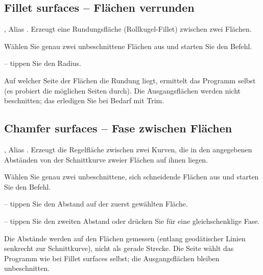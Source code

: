 \subsection{Fillet surfaces -- Flächen verrunden}\label{sec:cmd-fillet-surface}
, Alias . Erzeugt eine Rundungsfläche (Rollkugel-Fillet)
zwischen zwei Flächen.
\begin{schritte}
\item Wählen Sie genau zwei unbeschnittene Flächen aus und starten Sie den Befehl.
\item {} -- tippen Sie den Radius.
\end{schritte}
Auf welcher Seite der Flächen die Rundung liegt, ermittelt das Programm selbst (es probiert die
möglichen Seiten durch). Die Ausgangsflächen werden nicht beschnitten; das erledigen Sie bei
Bedarf mit Trim.

\subsection{Chamfer surfaces -- Fase zwischen Flächen}\label{sec:cmd-chamfer-surface}
, Alias . Erzeugt die Regelfläche zwischen zwei Kurven,
die in den angegebenen Abständen von der Schnittkurve zweier Flächen auf ihnen liegen.
\begin{schritte}
\item Wählen Sie genau zwei unbeschnittene, sich schneidende Flächen aus und starten Sie den
  Befehl.
\item {} -- tippen Sie den Abstand auf der
  zuerst gewählten Fläche.
\item {} -- tippen Sie den
  zweiten Abstand oder drücken Sie  für eine gleichschenklige Fase.
\end{schritte}
Die Abstände werden auf den Flächen gemessen (entlang geodätischer Linien senkrecht zur
Schnittkurve), nicht als gerade Strecke. Die Seite wählt das Programm wie bei Fillet surfaces
selbst; die Ausgangsflächen bleiben unbeschnitten.


